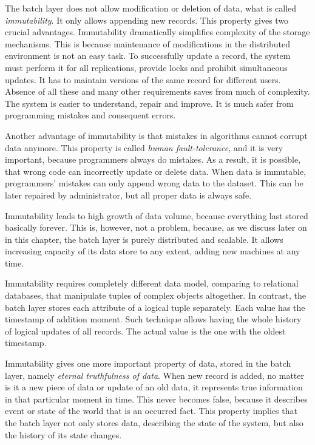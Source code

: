The batch layer does not allow modification or deletion of data, what is called \textit{immutability}.
It only allows appending new records.
This property gives two crucial advantages.
Immutability dramatically simplifies complexity of the storage mechanisms.
This is because maintenance of modifications in the distributed environment is not an easy task.
To successfully update a record, the system must perform it for all replications, provide locks and prohibit simultaneous updates.
It has to maintain versions of the same record for different users.
Absence of all these and many other requirements saves from much of complexity.
The system is easier to understand, repair and improve.
It is much safer from programming mistakes and consequent errors.

Another advantage of immutability is that mistakes in algorithms cannot corrupt data anymore.
This property is called \textit{human fault-tolerance}, and it is very important, because programmers always do mistakes.
As a result, it is possible, that wrong code can incorrectly update or delete data.
When data is immutable, programmers' mistakes can only append wrong data to the dataset.
This can be later repaired by administrator, but all proper data is always safe.

Immutability leads to high growth of data volume, because everything last stored basically forever.
This is, however, not a problem, because, as we discuss later on in this chapter, the batch layer is purely distributed and scalable.
It allows increasing capacity of its data store to any extent, adding new machines at any time.

Immutability requires completely different data model, comparing to relational databases, that manipulate tuples of complex objects altogether.
In contrast, the batch layer stores each attribute of a logical tuple separately.
Each value has the timestamp of addition moment. 
Such technique allows having the whole history of logical updates of all records.
The actual value is the one with the oldest timestamp.

Immutability gives one more important property of data, stored in the batch layer, namely \textit{eternal truthfulness of data}.
When new record is added, no matter is it a new piece of data or update of an old data, it represents true information in that particular moment in time.
This never becomes false, because it describes event or state of the world that is an occurred fact.
This property implies that the batch layer not only stores data, describing the state of the system, but also the history of its state changes.

